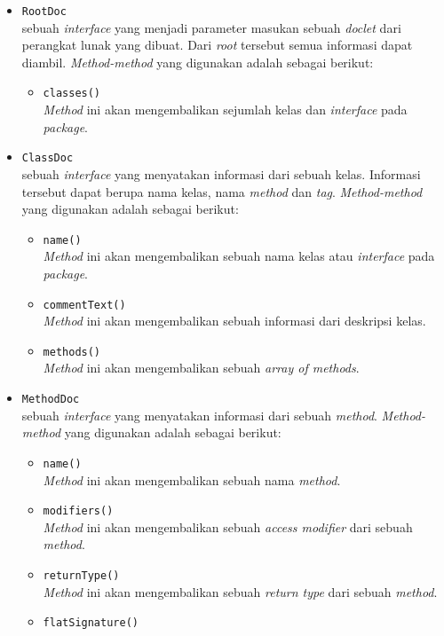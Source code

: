 \begin{itemize}
	\item {\tt RootDoc}\\
	sebuah {\it interface} yang menjadi parameter masukan sebuah {\it doclet} dari perangkat lunak yang dibuat. Dari {\it root} tersebut semua informasi dapat diambil. {\it Method-method} yang digunakan adalah sebagai berikut:
	\begin{itemize}
		\item {\tt classes()}\\
		{\it Method} ini akan mengembalikan sejumlah kelas dan {\it interface} pada {\it package}.
	\end{itemize}
	\item {\tt ClassDoc}\\
	sebuah {\it interface} yang menyatakan informasi dari sebuah kelas. Informasi tersebut dapat berupa nama kelas, nama {\it method} dan {\it tag}. {\it Method-method} yang digunakan adalah sebagai berikut:
	\begin{itemize}
		\item {\tt name()}\\
		{\it Method} ini akan mengembalikan sebuah nama kelas atau {\it interface} pada {\it package}.
		\item {\tt commentText()}\\
		{\it Method} ini akan mengembalikan sebuah informasi dari deskripsi kelas.
		\item {\tt methods()}\\
		{\it Method} ini akan mengembalikan sebuah {\it array of methods}.
	\end{itemize}
	\item {\tt MethodDoc}\\
	sebuah {\it interface} yang menyatakan informasi dari sebuah {\it method}. {\it Method-method} yang digunakan adalah sebagai berikut:
	\begin{itemize}
		\item {\tt name()}\\
		{\it Method} ini akan mengembalikan sebuah nama {\it method}.
		\item {\tt modifiers()}\\
		{\it Method} ini akan mengembalikan sebuah {\it access modifier} dari sebuah {\it method}.
		\item {\tt returnType()}\\
		{\it Method} ini akan mengembalikan sebuah {\it return type} dari sebuah {\it method}.
		\item {\tt flatSignature()}\\

\end{itemize}
\end{itemize}
